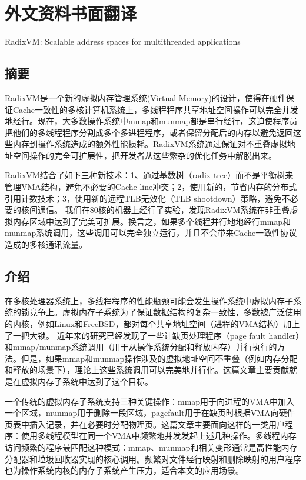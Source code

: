 
\chapter{外文资料书面翻译}

\begin{center}
RadixVM: Scalable address spaces for multithreaded applications
\end{center}

\section{摘要}

RadixVM是一个新的虚拟内存管理系统(Virtual
Memory)的设计，使得在硬件保证Cache一致性的多核计算机系统上，多线程程序共享地址空间操作可以完全并发地经行。现在，大多数操作系统中mmap和munmap都是串行经行，这迫使程序员把他们的多线程程序分割成多个多进程程序，或者保留分配后的内存以避免返回这些内存到操作系统造成的额外性能损耗。RadixVM系统通过保证对不重叠虚拟地址空间操作的完全可扩展性，把开发者从这些繁杂的优化任务中解脱出来。

RadixVM结合了如下三种新技术：1、通过基数树（radix
tree）而不是平衡树来管理VMA结构，避免不必要的Cache
line冲突；2，使用新的，节省内存的分布式引用计数技术；3，使用新的远程TLB无效化（TLB
shootdown）策略，避免不必要的核间通信。
我们在80核的机器上经行了实验，发现RadixVM系统在非重叠虚拟内存区域中达到了完美可扩展。换言之，如果多个线程并行地地经行mmap和munmap系统调用，这些调用可以完全独立运行，并且不会带来Cache一致性协议造成的多核通讯流量。


\section{介绍}
在多核处理器系统上，多线程程序的性能瓶颈可能会发生操作系统中虚拟内存子系统的锁竞争上。虚拟内存子系统为了保证数据结构的复杂一致性，多数被广泛使用的内核，例如Linux和FreeBSD，都对每个共享地址空间（进程的VMA结构）加上了一把大锁。
近年来的研究已经发现了一些让缺页处理程序（page fault
handler）和mmap/munmap系统调用（用于从操作系统分配和释放内存）并行执行的方法。但是，如果mmap和munmap操作涉及的虚拟地址空间不重叠（例如内存分配和释放的场景下），理论上这些系统调用可以完美地并行化。这篇文章主要贡献就是在虚拟内存子系统中达到了这个目标。

一个传统的虚拟内存子系统支持三种关键操作：mmap用于向进程的VMA中加入一个区域，munmap用于删除一段区域，pagefault用于在缺页时根据VMA向硬件页表中插入记录，并在必要时分配物理页。这篇文章主要面向这样的一类用户程序：使用多线程模型在同一个VMA中频繁地并发发起上述几种操作。多线程内存访问频繁的程序最匹配这种模式：mmap、munmap和相关变形通常是高性能内存分配器和垃圾回收器实现的核心调用。频繁对文件经行映射和删除映射的用户程序也为操作系统内核的内存子系统产生压力，适合本文的应用场景。


